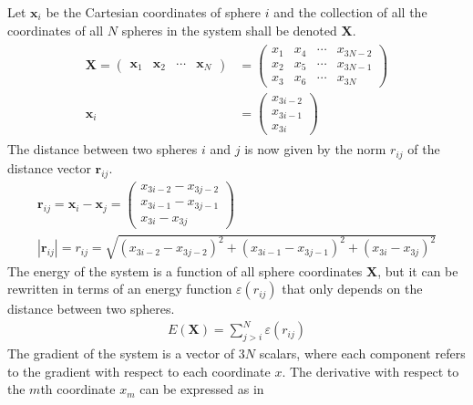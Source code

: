 Let $\mathbf{x}_i$ be the Cartesian coordinates of sphere $i$ and the
collection of all the coordinates of all $N$ spheres in the system shall be
denoted $\mathbf{X}$.
%
\begin{align}
    \begin{aligned}
        \mathbf{X}=
        \begin{pmatrix}
            \mathbf{x}_1 & \mathbf{x}_2 & \cdots & \mathbf{x}_N
        \end{pmatrix}&=
        \begin{pmatrix}
            x_1 & x_4 & \cdots & x_{3N-2}\\
            x_2 & x_5 & \cdots & x_{3N-1}\\
            x_3 & x_6 & \cdots & x_{3N}
        \end{pmatrix}\\
            \mathbf{x}_i &= 
            \begin{pmatrix}
                x_{3i-2}\\
                x_{3i-1}\\
                x_{3i}
            \end{pmatrix}
    \end{aligned}
\end{align}%
%
The distance between two spheres $i$ and $j$ is now given by the norm $r_{ij}$
of the distance vector $\mathbf{r}_{ij}$. %
%
\begin{align}
    \mathbf{r}_{ij}=\mathbf{x}_i-\mathbf{x}_j=
    \begin{pmatrix}
        x_{3i-2} - x_{3j-2}\\
        x_{3i-1} - x_{3j-1}\\
        x_{3i} - x_{3j}
    \end{pmatrix}\label{eq:distancevector}\\
    |\mathbf{r}_{ij}|=r_{ij}=\sqrt{(x_{3i-2} - x_{3j-2})^2 + (x_{3i-1} - x_{3j-1})^2 + (x_{3i} - x_{3j})^2}\label{eq:distance}
\end{align}
%
The energy of the system is a function of all sphere coordinates $\mathbf{X}$,
but it can be rewritten in terms of an energy function $\varepsilon(r_{ij})$ that only depends on the
distance between two spheres. %
%
\begin{align}
    E(\mathbf{X})=\sum_{j>i}^N\varepsilon(r_{ij})
\end{align}%
%
The gradient of the system is a vector of $3N$ scalars, where each component
refers to the gradient with respect to each coordinate $x$. The derivative with
respect to the $m$th coordinate $x_m$ can be expressed as in
